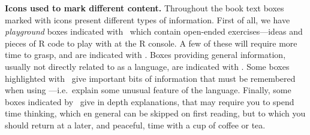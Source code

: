 \begin{framed}
\noindent
\textbf{Icons used to mark different content.} Throughout the book text boxes marked with icons present different types of information. First of all, we have \emph{playground} boxes indicated with \playicon\ which contain open-ended exercises---ideas and pieces of R code to play with at the R console. A few of these will require more time to grasp, and are indicated with \advplayicon. Boxes providing general information, usually not directly related to  as a language, are indicated with \infoicon. Some boxes highlighted with \ilAttention\ give important bits of information that must be remembered when using ---i.e.\ explain some unusual feature of the language. Finally, some boxes indicated by \ilAdvanced\ give in depth explanations, that may require you to spend time thinking, which en general can be skipped on first reading, but to which you should return at a later, and peaceful, time with a cup of coffee or tea.
\end{framed}
\newpage

